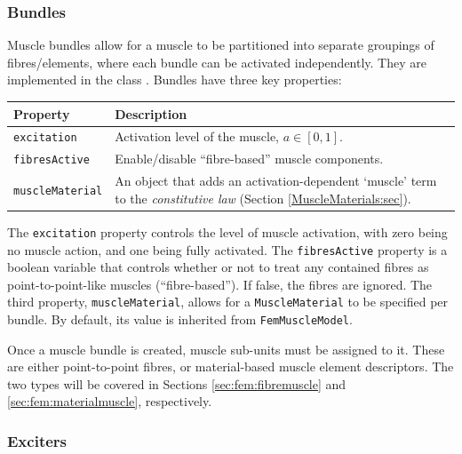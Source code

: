 \subsubsection{Bundles}
\label{MuscleBundles:sec}
\ifLaTeXML{\newline}

Muscle bundles allow for a muscle to be partitioned into separate groupings
of fibres/elements, where each bundle can be activated independently.  They 
are implemented in the class .
Bundles have three key properties:
\begin{center}
	\begin{tabular}{|ll|}
		\hline
		Property & Description\\
		\hline
		{\tt excitation} & Activation level of the muscle,  $a\in[0, 1]$.\\
		{\tt fibresActive} & Enable/disable ``fibre-based'' muscle components.\\
		{\tt muscleMaterial} & An object that adds an activation-dependent
		                       `muscle' term to the \emph{constitutive law} (Section \ref{MuscleMaterials:sec}).\\
		\hline
	\end{tabular}
\end{center}
The {\tt excitation} property controls the level of muscle activation, with zero 
being no muscle action, and one being fully activated.  The {\tt fibresActive} 
property is a boolean variable that controls whether or not to treat any 
contained fibres as point-to-point-like muscles (``fibre-based'').  If false, 
the fibres are ignored.  The third property, {\tt muscleMaterial}, allows for a 
{\tt MuscleMaterial} to be specified per bundle.  By default, its value is 
inherited from {\tt FemMuscleModel}.

Once a muscle bundle is created, muscle sub-units must be assigned to it.  These
are either point-to-point fibres, or material-based muscle element descriptors.
The two types will be covered in Sections \ref{sec:fem:fibremuscle} and
\ref{sec:fem:materialmuscle}, respectively.

\subsubsection{Exciters}
\label{MuscleExciters:sec}
\ifLaTeXML{\newline}

